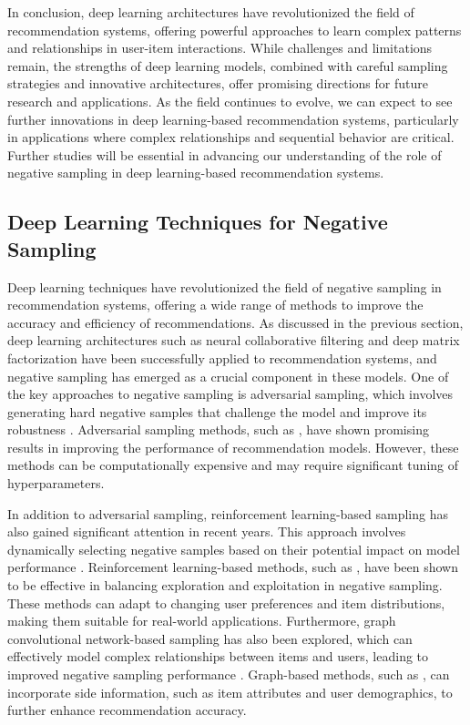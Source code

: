 \documentclass[11pt,a4paper]{article}
\begin{document}
In conclusion, deep learning architectures have revolutionized the field of recommendation systems, offering powerful approaches to learn complex patterns and relationships in user-item interactions. While challenges and limitations remain, the strengths of deep learning models, combined with careful sampling strategies and innovative architectures, offer promising directions for future research and applications. As the field continues to evolve, we can expect to see further innovations in deep learning-based recommendation systems, particularly in applications where complex relationships and sequential behavior are critical. Further studies will be essential in advancing our understanding of the role of negative sampling in deep learning-based recommendation systems.


\subsection{Deep Learning Techniques for Negative Sampling}


Deep learning techniques have revolutionized the field of negative sampling in recommendation systems, offering a wide range of methods to improve the accuracy and efficiency of recommendations. As discussed in the previous section, deep learning architectures such as neural collaborative filtering and deep matrix factorization have been successfully applied to recommendation systems, and negative sampling has emerged as a crucial component in these models. One of the key approaches to negative sampling is adversarial sampling, which involves generating hard negative samples that challenge the model and improve its robustness \cite{doi:10.1587/transinf.2017edr0003}. Adversarial sampling methods, such as \cite{doi:10.1609/aaai.v32i1.11835}, have shown promising results in improving the performance of recommendation models. However, these methods can be computationally expensive and may require significant tuning of hyperparameters.

In addition to adversarial sampling, reinforcement learning-based sampling has also gained significant attention in recent years. This approach involves dynamically selecting negative samples based on their potential impact on model performance \cite{arxiv:1603.05359}. Reinforcement learning-based methods, such as \cite{doi:10.1145/3397271.3401181}, have been shown to be effective in balancing exploration and exploitation in negative sampling. These methods can adapt to changing user preferences and item distributions, making them suitable for real-world applications. Furthermore, graph convolutional network-based sampling has also been explored, which can effectively model complex relationships between items and users, leading to improved negative sampling performance \cite{arxiv:1707.07435}. Graph-based methods, such as \cite{doi:10.1145/3583780.3615134}, can incorporate side information, such as item attributes and user demographics, to further enhance recommendation accuracy.
\end{document}
